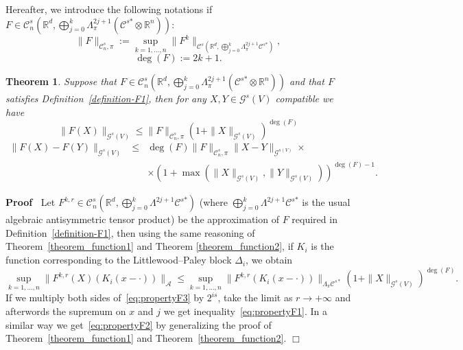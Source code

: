 \documentclass{article}
\newcommand{\assign}{:=}
\newcommand{\asterisk}{\mathord{*}}
\newenvironment{proof}{\noindent\textbf{Proof\ }}{\hspace*{\fill}$\Box$\medskip}
\newtheorem{theorem}{Theorem}
\begin{document}
Hereafter, we introduce the following notations if $F \in \mathcal{C}^s_n
\left( \mathbb{R}^d, \bigoplus_{j = 0}^k \Lambda^{2 j + 1}_{\pi}
(\mathcal{C}^{s \asterisk} \otimes \mathbb{R}^n) \right)$:
\[ \| F \|_{\mathcal{C}^s_n, \pi} \assign \sup_{k = 1, \ldots, n} \| F^k
   \|_{\mathcal{C}^s \left( \mathbb{R}^d, \bigoplus_{j = 0}^k \Lambda^{2 j +
   1}_{\pi} \mathcal{C}^{s \asterisk} \right)}, \]
\[ \deg (F) \assign 2 k + 1. \]
\begin{theorem}
  \label{theorem_drift}Suppose that $F \in \mathcal{C}^s_n \left(
  \mathbb{R}^d, \bigoplus_{j = 0}^k \Lambda^{2 j + 1}_{\pi} (\mathcal{C}^{s
  \asterisk} \otimes \mathbb{R}^n) \right)$ and that $F$ satisfies
  Definition~\ref{definition-F1}, then for any $X, Y \in \mathcal{G}^s (V)$
  compatible we have
  \begin{equation}
    \| F (X) \|_{\mathcal{G}^s (V)} \leqslant \| F \|_{\mathcal{C}^s_n, \pi}
    (1 + \| X \|_{\mathcal{G}^s (V)})^{\deg (F)} \label{eq:propertyF1}
  \end{equation}
  \begin{eqnarray}
    \| F (X) - F (Y) \|_{\mathcal{G}^s (V)} & \leqslant & \deg (F) \| F
    \|_{\mathcal{C}^s_n, \pi} \| X - Y \|_{\mathcal{G}^{s (V)}} \times
    \nonumber\\
    &  & \times (1 + \max (\| X \|_{\mathcal{G}^s (V)}, \| Y
    \|_{\mathcal{G}^s (V)}))^{\deg (F) - 1} .  \label{eq:propertyF2}
  \end{eqnarray}
\end{theorem}

\begin{proof}
  Let $F^{k, r} \in \mathcal{C}^s_n \left( \mathbb{R}^d, \bigoplus_{j = 0}^k
  \Lambda^{2 j + 1} \mathcal{C}^{s \asterisk} \right)$ (where $\bigoplus_{j =
  0}^k \Lambda^{2 j + 1} \mathcal{C}^{s \asterisk}$ is the usual algebraic
  antisymmetric tensor product) be the approximation of $F$ required in
  Definition~\ref{definition-F1}, then using the same reasoning of
  Theorem~\ref{theorem_function1} and Theorem \ref{theorem_function2}, if
  $K_i$ is the function corresponding to the Littlewood--Paley block
  $\Delta_i$, we obtain
  \begin{equation}
    \sup_{k = 1, \ldots, n} \| F^{k, r} (X) (K_i (x - \cdot)) \|_{\mathcal{A}}
    \leqslant \sup_{k = 1, \ldots, n} \| F^{k, r} (K_i (x - \cdot))
    \|_{\Lambda_{\pi} \mathcal{C}^{s \ast}} (1 + \| X \|_{\mathcal{G}^s
    (V)})^{\deg (F)} . \label{eq:propertyF3}
  \end{equation}
  If we multiply both sides of~{\eqref{eq:propertyF3}} by $2^{i s}$, take the
  limit as $r \rightarrow + \infty$ and afterwords the supremum on $x$ and $j$
  we get inequality~{\eqref{eq:propertyF1}}. In a similar way we
  get~{\eqref{eq:propertyF2}} by generalizing the proof of
  Theorem~\ref{theorem_function1} and Theorem~\ref{theorem_function2}.
\end{proof}
\end{document}
